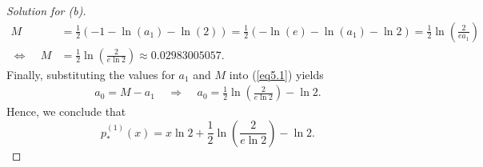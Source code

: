 \documentclass[8pt]{article}
\theoremstyle{definition}
\begin{document}
\begin{proof}[Solution for (b)]
\begin{align*}
M &= \frac{1}{2} \left( -1 - \ln(a_1) - \ln(2) \right) = \frac{1}{2} \left( -\ln(e) - \ln(a_1) - \ln 2 \right) = \frac{1}{2} \ln \left( \frac{2}{e a_1} \right) \\
\Longleftrightarrow \ \ \ \ \ M &= \frac{1}{2} \ln \left( \frac{2}{e \ln2} \right) \approx 0.02983005057.
\end{align*}
Finally, substituting the values for $a_1$ and $M$ into (\ref{eq5.1}) yields
\begin{align*}
a_0 = M - a_1 \ \ \ \ \ \Longrightarrow \ \ \ \ \ a_0 = \frac{1}{2} \ln \left( \frac{2}{e \ln 2} \right) - \ln 2.
\end{align*}
Hence, we conclude that $$p_*^{(1)} (x) = x \ln 2 + \frac{1}{2} \ln \left( \frac{2}{e \ln 2} \right) - \ln 2.$$
\end{proof}
\end{document}
